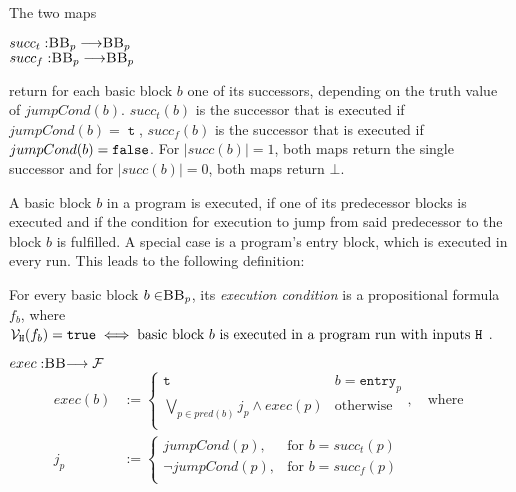 \begin{definition}
    The two maps
    \begin{center}
        $succ_t : \mbb_p \longrightarrow \mbb_p$\\
        $succ_f : \mbb_p \longrightarrow \mbb_p$\\
    \end{center}
    return for each basic block $b$ one of its successors, depending on the truth value of $jumpCond(b)$. $succ_t(b)$ is the successor that is executed if $jumpCond(b) = \mttt$, $succ_f(b)$ is the successor that is executed if $jumpCond(b) = \mathtt{false}$. For $|succ(b)| = 1$, both maps return the single successor and for $|succ(b)| = 0$, both maps return $\bot$.

\end{definition}

A basic block $b$ in a program is executed, if one of its predecessor blocks is executed and if the condition for execution to jump from said predecessor to the block $b$ is fulfilled. A special case is a program's entry block, which is executed in every run. This leads to the following definition: 

\begin{definition}
    For every basic block $b \in \mbb_p$, its \emph{execution condition} is a propositional formula $f_b$, where $\mathcal{V}_{\mathtt{H}}(f_b) = \mathtt{true} \iff \text{basic block $b$ is executed in a program run with inputs \texttt{H} }$. 
    \begin{center}
        $exec: \mbb \longrightarrow \mbform$\\
        \begin{align*}
            exec(b) &:= \begin{cases}
                \mttt &  b = \mathtt{entry}_p\\
                \bigvee\limits_{p \in pred(b)} j_p \land exec(p) & \text{otherwise}\\
        \end{cases}, \quad \text{where }\\
        j_p &:= \begin{cases}
            jumpCond(p), & \text{for } b = succ_t(p)\\
        \lnot jumpCond(p), & \text{for } b = succ_f(p)\\
        \end{cases}
        \end{align*}
    \end{center}
\end{definition}

